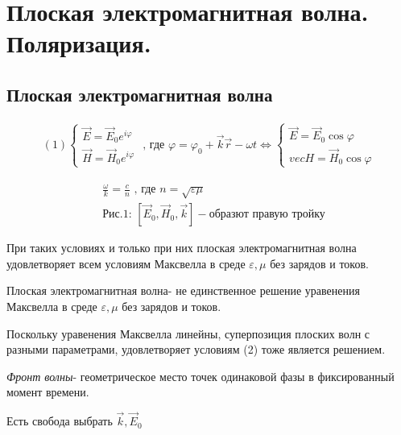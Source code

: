 \section{Плоская электромагнитная волна. Поляризация.}

\subsection*{Плоская электромагнитная волна}

\[
\begin{aligned}
    (1)
    \begin{cases}
        \vec{E}=\vec{E}_0e^{i\varphi} \\
        \vec{H}=\vec{H}_0e^{i\varphi} 
    \end{cases}
    \text{ , где } \varphi=\varphi_0+\vec{k}\vec{r}-\omega t 
    \Leftrightarrow
    \begin{cases}
        \vec{E}=\vec{E}_0\cos\varphi \\
        vec{H}=\vec{H}_0\cos\varphi
    \end{cases}
\end{aligned}
\]

\[
\boxed{
    \begin{aligned}
        &\frac{\omega}{k}=\frac{c}{n} \text{ , где } n=\sqrt{\varepsilon\mu} \\
        & \text{Рис.1: }[\vec{E}_0,\vec{H}_0,\vec{k}]-\text{образют правую тройку}
    \end{aligned}
}
\]

При таких условиях и только при них плоская электромагнитная волна удовлетворяет всем условиям Максвелла в среде \( \varepsilon,\mu \) без зарядов и токов.

Плоская электромагнитная волна- не единственное решение уравенения Максвелла в среде \( \varepsilon,\mu \) без зарядов и токов.

Поскольку уравенения Максвелла линейны, суперпозиция плоских волн с разными параметрами, удовлетворяет условиям (2) тоже является решением.

\textit{Фронт волны}- геометрическое место точек одинаковой фазы в фиксированный момент времени. 

Есть свобода выбрать \( \vec{k}, \vec{E}_0 \)

